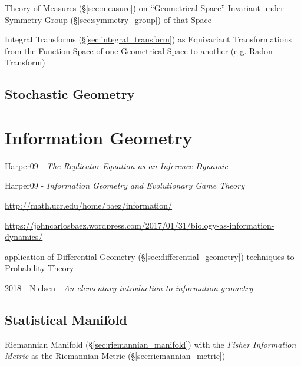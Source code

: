 Theory of Measures (\S\ref{sec:measure}) on ``Geometrical Space'' Invariant
under Symmetry Group (\S\ref{sec:symmetry_group}) of that Space

Integral Transforms (\S\ref{sec:integral_transform}) as Equivariant
Transformations from the Function Space of one Geometrical Space to another
(e.g. Radon Transform)



\subsection{Stochastic Geometry}\label{sec:stochastic_geometry}



\section{Information Geometry}\label{sec:information_geometry}

Harper09 - \emph{The Replicator Equation as an Inference Dynamic}

Harper09 - \emph{Information Geometry and Evolutionary Game Theory}

\url{http://math.ucr.edu/home/baez/information/}

\url{https://johncarlosbaez.wordpress.com/2017/01/31/biology-as-information-dynamics/}

application of Differential Geometry
(\S\ref{sec:differential_geometry}) techniques to Probability Theory

2018 - Nielsen - \emph{An elementary introduction to information geometry}



\subsection{Statistical Manifold}\label{sec:statistical_manifold}

Riemannian Manifold (\S\ref{sec:riemannian_manifold}) with the
\emph{Fisher Information Metric} as the Riemannian Metric
(\S\ref{sec:riemannian_metric})



